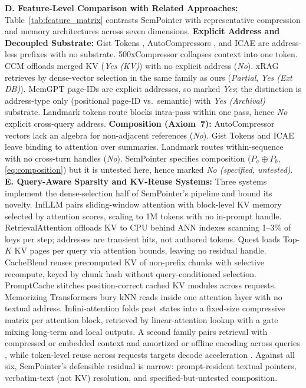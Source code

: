 \documentclass[runningheads]{llncs}
\begin{document}
{\enlargethispage{2\baselineskip}
\noindent\textbf{D. Feature-Level Comparison with Related Approaches:}
Table~\ref{tab:feature_matrix} contrasts SemPointer with representative compression and memory architectures across seven dimensions.
\textbf{Explicit Address and Decoupled Substrate:} Gist Tokens \cite[§2]{mu2023gist}, AutoCompressors \cite[§3.1]{chevalier2023autocompressors}, and ICAE \cite[§2]{ge2024icae} are address-less prefixes with no substrate. 500xCompressor \cite[§3]{li2025500xcompressor} collapses context into one token. CCM \cite[§3.2]{kim2024ccm} offloads merged KV (\emph{Yes (KV)}) with no explicit address (\emph{No}). xRAG \cite[§2.2]{cheng2024xrag} retrieves by dense-vector selection in the same family as ours (\emph{Partial}, \emph{Yes (Ext DB)}). MemGPT \cite{packer2023memgpt} page-IDs are explicit addresses, so marked \emph{Yes}; the distinction is address-type only (positional page-ID vs.\ semantic) with \emph{Yes (Archival)} substrate. Landmark \cite[§3]{mohtashami2023landmark} tokens route blocks intra-pass within one pass, hence \emph{No} explicit cross-query address.
\textbf{Composition (Axiom~7):} AutoCompressor vectors \cite[§3.1]{chevalier2023autocompressors} lack an algebra for non-adjacent references (\emph{No}). Gist Tokens \cite{mu2023gist} and ICAE \cite{ge2024icae} leave binding to attention over summaries. Landmark \cite[§3]{mohtashami2023landmark} routes within-sequence with no cross-turn handles (\emph{No}). SemPointer specifies composition ($P_a \oplus P_b$, \eqref{eq:composition}) but it is untested here, hence marked \emph{No (specified, untested)}.
\noindent\textbf{E. Query-Aware Sparsity and KV-Reuse Systems:} Three systems implement the dense-selection half of SemPointer's pipeline and bound its novelty. InfLLM \cite{xiao2024infllm} pairs sliding-window attention with block-level KV memory selected by attention scores, scaling to 1M tokens with no in-prompt handle. RetrievalAttention \cite{liu2025retrievalattention} offloads KV to CPU behind ANN indexes scanning 1--3\% of keys per step; addresses are transient hits, not authored tokens. Quest \cite{tang2024quest} loads Top-$K$ KV pages per query via attention bounds, leaving no residual handle. CacheBlend \cite{yao2025cacheblend} reuses precomputed KV of non-prefix chunks with selective recompute, keyed by chunk hash without query-conditioned selection. PromptCache \cite{gim2024promptcache} stitches position-correct cached KV modules across requests. Memorizing Transformers \cite{wu2022memorizing} bury kNN reads inside one attention layer with no textual address. Infini-attention \cite{munkhdalai2024infiniattention} folds past states into a fixed-size compressive matrix per attention block, retrieved by linear-attention lookup with a gate mixing long-term and local outputs. A second family pairs retrieval with compressed or embedded context and amortized or offline encoding across queries \cite{xu2024recomp, rau2025cocom, tan2024lloco, gao2025uniicl, tack2024mac}, while token-level reuse across requests targets decode acceleration \cite{luo2025recycling}. Against all six, SemPointer's defensible residual is narrow: prompt-resident textual pointers, verbatim-text (not KV) resolution, and specified-but-untested composition.

}
\end{document}
